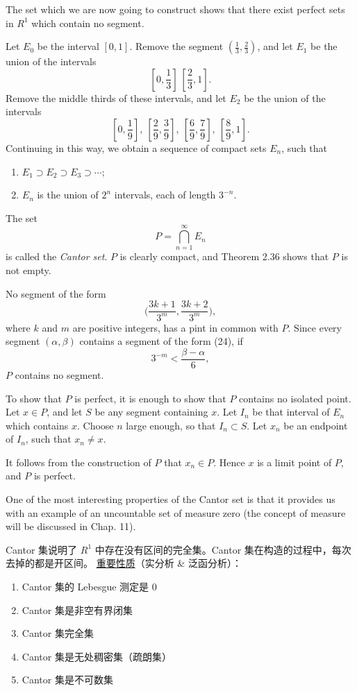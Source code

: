 \documentclass[../poma-notes.tex]{subfiles}
\begin{document}
\begin{namedtheorem}
  \normalfont
  The set which we are now going to construct shows that there exist perfect sets in $R^1$ which contain no segment.

  Let $E_0$ be the interval $[0,1]$. Remove the segment $(\frac{1}{3},\frac{2}{3})$, and let $E_1$ be the union of
  the intervals
  \[ [0,\frac{1}{3}]\ [\frac{2}{3},1]. \]
  Remove the middle thirds of these intervals, and let $E_2$ be the union of the intervals
  \[ [0,\frac{1}{9}],\ [\frac{2}{9},\frac{3}{9}],\ [\frac{6}{9},\frac{7}{9}],\ [\frac{8}{9},1]. \]
  Continuing in this way, we obtain a sequence of compact sets $E_n$, such that
  \begin{enumerate}[label=(\alph*)]
    \item $E_1 \supset E_2 \supset E_3 \supset \cdots$;
    \item $E_n$ is the union of $2^n$ intervals, each of length $3^{-n}$.
  \end{enumerate}

  The set
  \[ P = \bigcap\limits_{n=1}^{\infty} E_n \]
  is called the \textit{Cantor set}. $P$ is clearly compact, and Theorem 2.36 shows that $P$ is not empty.

  No segment of the form
  \begin{equation}
    \Biggl( \frac{3k+1}{3^m}, \frac{3k+2}{3^m} \Biggr),
  \end{equation}
  where $k$ and $m$ are positive integers, has a pint in common with $P$. Since every segment $(\alpha, \beta)$
  contains a segment of the form (24), if
  \[ 3^{-m} < \frac{\beta - \alpha}{6}, \]
  $P$ contains no segment.

  To show that $P$ is perfect, it is enough to show that $P$ contains no isolated point. Let $x \in P$, and let $S$
  be any segment containing $x$. Let $I_n$ be that interval of $E_n$ which contains $x$. Choose $n$ large enough,
  so that $I_n \subset S$. Let $x_n$ be an endpoint of $I_n$, such that $x_n \ne x$.

  It follows from the construction of $P$ that $x_n \in P$. Hence $x$ is a limit point of $P$, and $P$ is perfect.

  One of the most interesting properties of the Cantor set is that it provides us with an example of an uncountable
  set of measure zero (the concept of measure will be discussed in Chap. 11).
\end{namedtheorem}

\begin{anote}
  Cantor 集说明了 $R^1$ 中存在没有区间的完全集。Cantor 集在构造的过程中，每次去掉的都是开区间。
  \href{https://zhuanlan.zhihu.com/p/54711962}{重要性质}（实分析 \& 泛函分析）：
  \begin{enumerate}
    \item Cantor 集的 Lebesgue 测定是 0
    \item Cantor 集是非空有界闭集
    \item Cantor 集完全集
    \item Cantor 集是无处稠密集（疏朗集）
    \item Cantor 集是不可数集
  \end{enumerate}
\end{anote}
\end{document}
